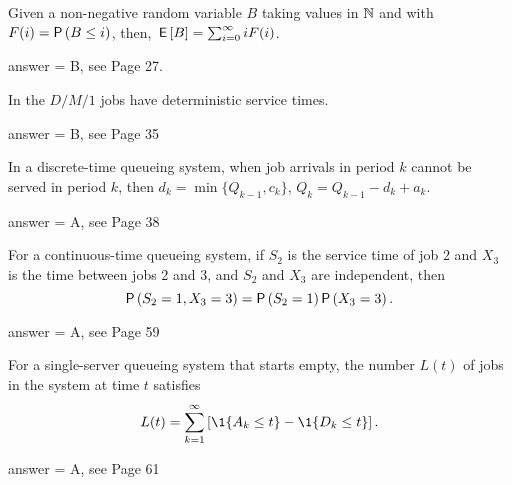 \begin{exercise}[201802]
Given a non-negative random variable $B$ taking values in $\mathbb{N}$ and with $F(i) = \P{B\leq i}$, 
then, $\,\mathsf{E}\left[B\right] = \sum_{i=0}^\infty i F(i)$.
\begin{solution}
answer = B, see Page 27. 
\end{solution}
\end{exercise}

\begin{exercise}[201802]
In the  $D/M/1$ jobs have deterministic service times.
\begin{solution}
answer = B, see Page 35
\end{solution}
\end{exercise}

\begin{exercise}[201802]
In a discrete-time queueing system, when job arrivals in period $k$ cannot be served in period $k$, then $d_k = \min\{Q_{k-1}, c_k\}$, $Q_k = Q_{k-1} -d_k + a_k.$
\begin{solution}
answer = A, see Page 38
\end{solution}
\end{exercise}

\begin{exercise}[201802]
For a continuous-time queueing system, if $S_2$ is the service time of job $2$ and $X_3$ is the time between jobs 2 and 3, and $S_2$ and $X_3$ are independent, then
\begin{equation*}
  \P{S_{2}=1, X_3=3} = \P{S_{2}=1}\P{X_3=3}.
\end{equation*}
\begin{solution}
answer = A, see Page 59
\end{solution}
\end{exercise}

\begin{exercise}[201802]
For a single-server queueing system that starts empty,  the number $L(t)$ of jobs in the system at time $t$ satisfies
  \begin{equation*}
      L(t) = \sum_{k=1}^\infty \left[\1{A_k \leq t} -  \1{D_k \leq t}\right].
  \end{equation*}
\begin{solution}
answer = A, see Page 61
\end{solution}
\end{exercise}

